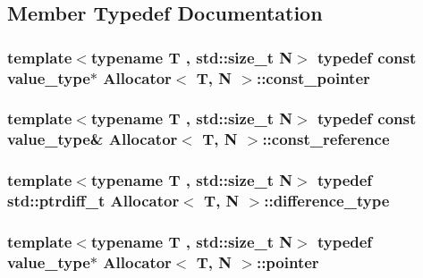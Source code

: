 \subsection{Member Typedef Documentation}
\hypertarget{classAllocator_a5815a9c01f756005eb19d0ae5aded3be}{
\subsubsection[{const\-\_\-pointer}]{\setlength{\rightskip}{0pt plus 5cm}template$<$typename T , std\-::size\-\_\-t N$>$ typedef const {\bf value\-\_\-type}$\ast$ {\bf Allocator}$<$ T, N $>$\-::{\bf const\-\_\-pointer}}}\label{classAllocator_a5815a9c01f756005eb19d0ae5aded3be}
\hypertarget{classAllocator_aff863afcf191fb225997ae2d51314bf5}{
\subsubsection[{const\-\_\-reference}]{\setlength{\rightskip}{0pt plus 5cm}template$<$typename T , std\-::size\-\_\-t N$>$ typedef const {\bf value\-\_\-type}\& {\bf Allocator}$<$ T, N $>$\-::{\bf const\-\_\-reference}}}\label{classAllocator_aff863afcf191fb225997ae2d51314bf5}
\hypertarget{classAllocator_a6b650764260187e63d5098f5f38046c2}{
\subsubsection[{difference\-\_\-type}]{\setlength{\rightskip}{0pt plus 5cm}template$<$typename T , std\-::size\-\_\-t N$>$ typedef std\-::ptrdiff\-\_\-t {\bf Allocator}$<$ T, N $>$\-::{\bf difference\-\_\-type}}}\label{classAllocator_a6b650764260187e63d5098f5f38046c2}
\hypertarget{classAllocator_a7df4693123ad6d168217e3853cd15495}{
\subsubsection[{pointer}]{\setlength{\rightskip}{0pt plus 5cm}template$<$typename T , std\-::size\-\_\-t N$>$ typedef {\bf value\-\_\-type}$\ast$ {\bf Allocator}$<$ T, N $>$\-::{\bf pointer}}}\label{classAllocator_a7df4693123ad6d168217e3853cd15495}
